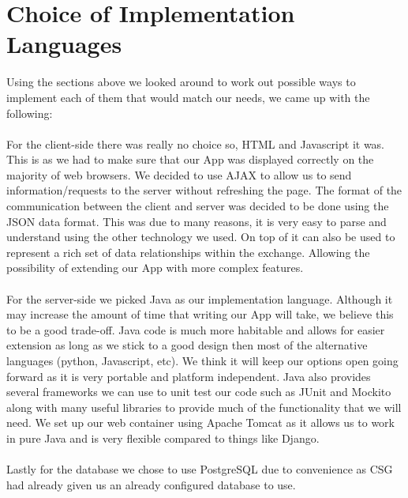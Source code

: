 \documentclass[11pt,a4paper]{article}
\begin{document}
\section{Choice of Implementation Languages}
Using the sections above we looked around to work out possible ways to implement each of them that would match our needs, we came up with the following: 
\\
\\
\noindent For the client-side there was really no choice so, HTML and Javascript it was. This is as we had to make sure that our App was displayed correctly on the majority of web browsers. We decided to use AJAX to allow us to send information/requests to the server without refreshing the page. The format of the communication between the client and server was decided to be done using the JSON data format.
This was due to many reasons, it is very easy to 
parse and understand using the other technology we used. On top of it can also be used to represent a rich set of data relationships within the exchange. Allowing the possibility of 
extending our App with more complex features.
\\
\\
\noindent
For the server-side we picked Java as our implementation language. Although it may increase the amount of time that writing our App will take, we believe this to be a good trade-off. Java code is much more habitable and allows for easier extension as long as we stick to a good design then most of the alternative languages (python, Javascript, etc). We think it will keep our options open going forward as it is very portable and platform independent. Java also provides several frameworks we can use to unit test our code such as JUnit and Mockito along with many useful libraries to provide much of the functionality that we will need. We set up our web container using Apache Tomcat as it allows us to work in pure Java and is very flexible compared to things like Django.
\\
\\
\noindent
Lastly for the database we chose to use PostgreSQL due to convenience as CSG had already given us an already configured database to use.  
\end{document}
